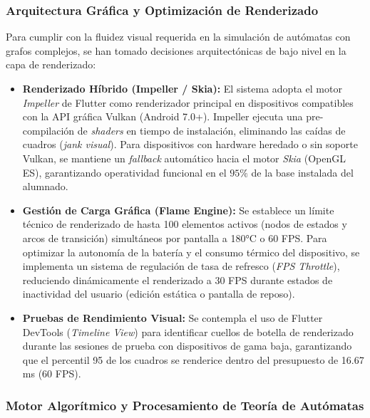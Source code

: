 \subsubsection{Arquitectura Gráfica y Optimización de Renderizado}

Para cumplir con la fluidez visual requerida en la simulación de autómatas con grafos complejos, se han tomado decisiones arquitectónicas de bajo nivel en la capa de renderizado:
\begin{itemize}
    \item \textbf{Renderizado Híbrido (Impeller / Skia):} El sistema adopta el motor \textit{Impeller} de Flutter como renderizador principal en dispositivos compatibles con la API gráfica Vulkan (Android 7.0+). Impeller ejecuta una pre-compilación de \textit{shaders} en tiempo de instalación, eliminando las caídas de cuadros (\textit{jank visual}). Para dispositivos con hardware heredado o sin soporte Vulkan, se mantiene un \textit{fallback} automático hacia el motor \textit{Skia} (OpenGL ES), garantizando operatividad funcional en el $95\%$ de la base instalada del alumnado.
    \item \textbf{Gestión de Carga Gráfica (Flame Engine):} Se establece un límite técnico de renderizado de hasta 100 elementos activos (nodos de estados y arcos de transición) simultáneos por pantalla a 180°C o 60 FPS. Para optimizar la autonomía de la batería y el consumo térmico del dispositivo, se implementa un sistema de regulación de tasa de refresco (\textit{FPS Throttle}), reduciendo dinámicamente el renderizado a 30 FPS durante estados de inactividad del usuario (edición estática o pantalla de reposo).
    \item \textbf{Pruebas de Rendimiento Visual:} Se contempla el uso de Flutter DevTools (\textit{Timeline View}) para identificar cuellos de botella de renderizado durante las sesiones de prueba con dispositivos de gama baja, garantizando que el percentil 95 de los cuadros se renderice dentro del presupuesto de 16.67 ms (60 FPS).
\end{itemize}

\subsubsection{Motor Algorítmico y Procesamiento de Teoría de Autómatas}

